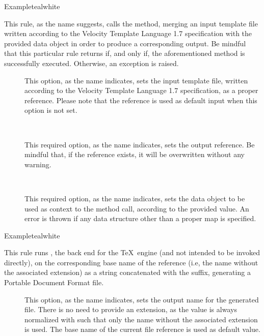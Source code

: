 \begin{description}
\begin{codebox}{Example}{teal}{\icnote}{white}
\end{codebox}

\item[\rulebox{velocity}{Paulo Cereda}] This rule, as the name suggests, calls the  method, merging an input template file written according to the Velocity Template Language 1.7 specification with the provided  data object in order to produce a corresponding  output. Be mindful that this particular rule returns  if, and only if, the aforementioned method is successfully executed. Otherwise, an exception is raised.

\begin{description}
\item[] This option, as the name indicates, sets the input template file, written according to the Velocity Template Language 1.7 specification, as a proper  reference. Please note that the  reference is used as default input when this option is not set.

\item[~\rqbox] This required option, as the name indicates, sets the output  reference. Be mindful that, if the reference exists, it will be overwritten without any warning.

\item[~\rqbox] This required option, as the name indicates, sets the  data object to be used as context to the method call, according to the provided value. An error is thrown if any data structure other than a proper map is specified.
\end{description}

\begin{codebox}{Example}{teal}{\icnote}{white}
\end{codebox}

\item[\rulebox{xdvipdfmx}{Marco Daniel, Paulo Cereda}] This rule runs , the back end for the  \TeX\ engine (and not intended to be invoked directly), on the corresponding base name of the  reference (i.e, the name without the associated extension) as a string concatenated with the  suffix, generating a Portable Document Format  file.

\begin{description}
\item[] This option, as the name indicates, sets the output name for the generated  file. There is no need to provide an extension, as the value is always normalized with  such that only the name without the associated extension is used. The base name of the current file reference is used as default value.


\end{description}
\end{description}
